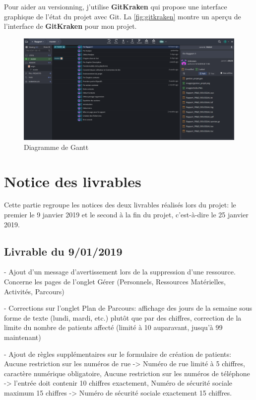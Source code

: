 \documentclass[noposter]{polytech/polytech}
\begin{document}
Pour aider au versionning, j'utilise \textbf{GitKraken} qui propose une interface graphique de l'état du projet avec Git. La \autoref{fig:gitkraken} montre un aperçu de l'interface de \textbf{GitKraken} pour mon projet.

\begin{figure}
	\includegraphics[scale=0.37]{images/gitkraken}
	\caption{Diagramme de Gantt}
	\label{fig:gitkraken}
\end{figure}

\chapter{Notice des livrables}

Cette partie regroupe les notices des deux livrables réalisés lors du projet: le premier le 9 janvier 2019 et le second à la fin du projet, c'est-à-dire le 25 janvier 2019.


\section{Livrable du 9/01/2019}

- Ajout d'un message d'avertissement lors de la suppression d'une ressource. Concerne les pages de l'onglet Gérer (Personnels, Ressources Matérielles, Activités, Parcours)

- Corrections sur l'onglet Plan de Parcours: affichage des jours de la semaine sous forme de texte (lundi, mardi, etc.) plutôt que par des chiffres, correction de la limite du nombre de patients affecté (limité à 10 auparavant, jusqu'à 99 maintenant)

- Ajout de règles supplémentaires sur le formulaire de création de patients: Aucune restriction sur les numéros de rue -> Numéro de rue limité à 5 chiffres, caractère numérique obligatoire, Aucune restriction sur les numéros de téléphone -> l'entrée doit contenir 10 chiffres exactement, Numéro de sécurité sociale maximum 15 chiffres -> Numéro de sécurité sociale exactement 15 chiffres.
\end{document}
